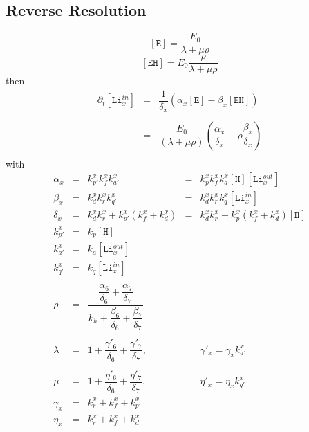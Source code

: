 \documentclass[aps,onecolumn,11pt]{revtex4}
\newcommand{\mychem}[1]{\mathtt{#1}}
\newcommand{\myconc}[1]{\left\lbrack{#1}\right\rbrack}
\newcommand{\LiIn}[1]{\myconc{\mychem{Li}_{#1}^{in}}}
\newcommand{\LiOut}[1]{\myconc{\mychem{Li}_{#1}^{out}}}
\newcommand{\EHin}{\myconc{\mychem{EH}}}
\newcommand{\Eout}{\myconc{\mychem{E}}}
\newcommand{\Hin}{\myconc{\mychem{H}}}
\begin{document}
\subsection{Reverse Resolution}
\begin{equation}
	\Eout = \dfrac{E_0}{\lambda + \mu \rho}
\end{equation}
\begin{equation}
	\EHin = E_0 \dfrac{\rho}{\lambda + \mu \rho}
\end{equation}
then
\begin{equation}
\begin{array}{rcl}
	\partial_t\LiIn{x} & = & \dfrac{1}{\delta_x}\left(\alpha_x \Eout - \beta_x \EHin \right)\\
	\\
	 & = & \dfrac{E_0}{\left(\lambda + \mu \rho\right)}
	 \left(\dfrac{\alpha_x}{\delta_x} - \rho \dfrac{\beta_x}{\delta_x}\right)
	 \\
\end{array}
\end{equation}
with
\begin{equation}
\begin{array}{rclcl}
	\alpha_x & = & k_{p'}^x k_f^x k_{a'}^x &  = &  k_{p}^x k_f^x k_{a}^x \Hin\LiOut{x}\\
	\beta_x  & = & k_d^x k_r^x k_{q'}^x    & = & k_d^x k_r^x k_{q}^x \LiIn{x}\\
	\delta_x & = & k_d^x k_r^x + k_{p'}^x\left(k_f^x+k_d^x\right) & = & k_d^x k_r^x + k_{p}^x\left(k_f^x+k_d^x\right)\Hin\\
	k_{p'}^x & = & k_p \Hin & & \\
	k_{a'}^x & = & k_a \LiOut{x} & & \\
	k_{q'}^x & = & k_q \LiIn{x}  & & \\
	\\
	\rho     & = & \dfrac{\dfrac{\alpha_6}{\delta_6}+\dfrac{\alpha_7}{\delta_7}}
	{k_h+\dfrac{\beta_6}{\delta_6}+\dfrac{\beta_7}{\delta_7}} & & \\
	\\
	\lambda  & = & 1 + \dfrac{\gamma'_6}{\delta_6} + \dfrac{\gamma'_7}{\delta_7},& & \gamma'_x = \gamma_x k_{a'}^x  \\
	\\
	\mu      & = & 1 + \dfrac{\eta'_6}{\delta_6} + \dfrac{\eta'_7}{\delta_7}, & & \eta'_x = \eta_x k_{q'}^x\\
	\gamma_x & = & k_r^x + k_f^x + k_{p'}^x  & & \\
	\eta_x   & = & k_r^x + k_f^x + k_d^x & & \\
\end{array}
\end{equation}
\end{document}
